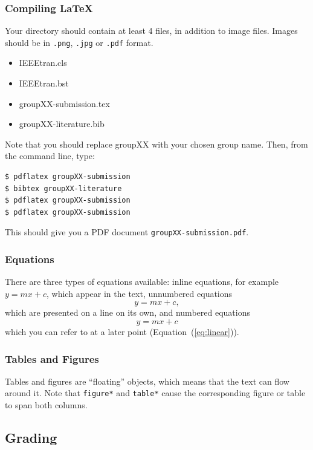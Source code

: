 \documentclass[10pt,conference,compsocconf]{IEEEtran}
\begin{document}
\subsubsection{Compiling \LaTeX{}}
Your directory should contain at least 4 files, in addition to image
files. Images should be in \texttt{.png}, \texttt{.jpg} or
\texttt{.pdf} format.
\begin{itemize}
\item IEEEtran.cls
\item IEEEtran.bst
\item groupXX-submission.tex
\item groupXX-literature.bib
\end{itemize}
Note that you should replace groupXX with your chosen group name.
Then, from the command line, type:
\begin{verbatim}
$ pdflatex groupXX-submission
$ bibtex groupXX-literature
$ pdflatex groupXX-submission
$ pdflatex groupXX-submission
\end{verbatim}
This should give you a PDF document \texttt{groupXX-submission.pdf}.

\subsubsection{Equations}

There are three types of equations available: inline equations, for
example $y=mx + c$, which appear in the text, unnumbered equations
$$y=mx + c,$$
which are presented on a line on its own, and numbered equations
\begin{equation}
  \label{eq:linear}
  y = mx + c
\end{equation}
which you can refer to at a later point (Equation~(\ref{eq:linear})).

\subsubsection{Tables and Figures}

Tables and figures are ``floating'' objects, which means that the text
can flow around it.
Note
that \texttt{figure*} and \texttt{table*} cause the corresponding
figure or table to span both columns.


\subsection{Grading}
\end{document}
